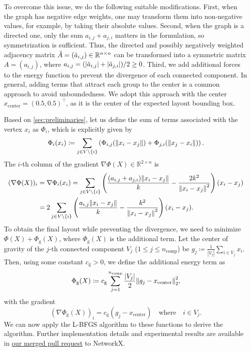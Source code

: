 \documentclass{jgaa-art}
\begin{document}
To overcome this issue, we do the following suitable modifications.
First, when the graph has negative edge weights, one may transform them into non-negative values, for example, by taking their absolute values.
Second, when the graph is a directed one, only the sum $a_{i, j}+ a_{j, i}$ matters in the formulation, so symmetrization is sufficient.
Thus, the directed and possibly negatively weighted adjacency matrix $\Tilde{A}= (\Tilde{a}_{i,j}) \in \mathbb{R}^{n \times n}$ can be transformed into a symmetric matrix $A = (a_{i,j})$, where $a_{i,j}= (\lvert \Tilde{a}_{i,j}\rvert + \lvert \Tilde{a}_{j,i}\rvert)/2 \geq 0$.
Third, we add additional forces to the energy function to prevent the divergence of each connected component.
In general, adding terms that attract each group to the center is a common approach to avoid unboundedness.
We adopt this approach with the center $x_{\mathrm{center}}=(0.5, 0.5)^{\top}$, as it is the center of the expected layout bounding box.

Based on \cref{sec:preliminaries}, let us define the sum of terms associated with the vertex $x_{i}$ as $\Phi_{i}$, which is explicitly given by
\begin{equation*}
  \Phi_{i}(x_{i}) \coloneqq \sum_{j \in V \setminus \{i\}}\left( \Phi_{i,j}(\norm{x_{i}- x_{j}}
    ) + \Phi_{j,i}(\norm{x_{j}- x_{i}}) \right).
\end{equation*}
The $i$-th column of the gradient $\nabla \Phi(X) \in \mathbb{R}^{2 \times n}$ is
\begin{align*}
  (\nabla \Phi(X))_{i} & = \nabla \Phi_{i}(x_{i}) = \sum_{j \in V \setminus \{i\}}\left(\frac{(a_{i,j}+a_{j,i})\norm{ x_{i}- x_{j}}}{k}- \frac{2k^{2}}{\norm{ x_{i}- x_{j}}^{2}}\right) (x_{i}- x_{j}) \\
                       & = 2 \sum_{j \in V \setminus \{i\}}\left(\frac{a_{i,j}\norm{ x_{i}- x_{j}}}{k}- \frac{k^{2}}{\norm{ x_{i}- x_{j}}^{2}}\right) (x_{i}- x_{j}).
\end{align*}
To obtain the final layout while preventing the divergence, we need to minimize $\Phi(X) + \Phi_{\mathrm{g}}(X)$, where $\Phi_{\mathrm{g}}(X)$ is the additional term.
Let the center of gravity of the $j$-th connected component $V_{j}$ ($1 \leq j \leq n_{\mathrm{comp}}$) be $g_{j}\coloneqq \frac{1}{|V_{j}|}\sum_{i \in V_j}x_{i}$.
Then, using some constant $c_{\mathrm{g}}>0$, we define the additional energy term as
\begin{equation*}
  \Phi_{\mathrm{g}}(X) \coloneqq c_{\mathrm{g}}\sum_{j=1}^{n_{\mathrm{comp}}}\frac{\lvert V_{j}\rvert}{2}
  \norm{ g_{j} - x_{\mathrm{center}}}_{2}^{2},
\end{equation*}
with the gradient
\begin{equation*}
  (\nabla \Phi_{\mathrm{g}}(X))_{i}= c_{\mathrm{g}}(g_{j}- x_{\mathrm{center}}) \quad
  \text{where}\quad i \in V_{j}.
\end{equation*}
We can now apply the L-BFGS algorithm to these functions to derive the algorithm.
Further implementation details and experimental results are available in \href{https://github.com/networkx/networkx/pull/7889}{our merged pull request} to NetworkX.
\end{document}
